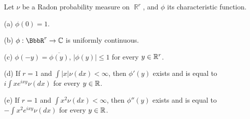  Let $\nu$ be a Radon probability measure on
$\BbbR^r$, and $\phi$ its characteristic function.

(a) $\phi(0)=1$.

(b) $\phi:\BbbR^r\to\Bbb C$ is uniformly continuous.

(c) $\phi(-y)=\overline{\phi(y)}$, $|\phi(y)|\le 1$ for every $y\in\Bbb
R^r$.

(d) If $r=1$ and $\int|x|\nu(dx)<\infty$, then $\phi'(y)$ exists and is
equal to $i\int xe^{ixy}\nu(dx)$ for every $y\in\Bbb R$.

(e) If $r=1$ and $\int x^2\nu(dx)<\infty$, then $\phi''(y)$ exists and
is equal to $-\int x^2e^{ixy}\nu(dx)$ for every $y\in\Bbb R$.


